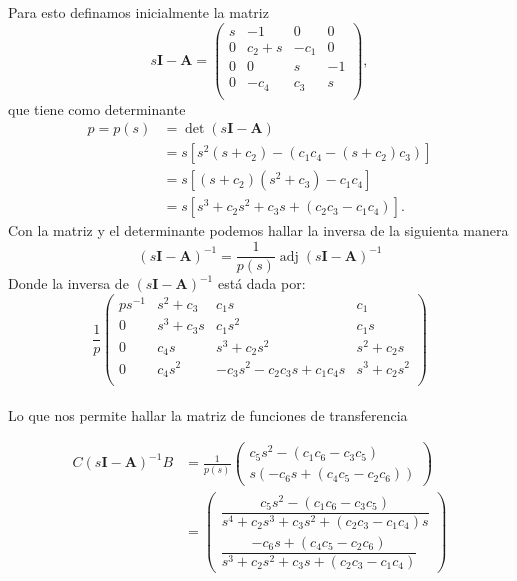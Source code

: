 Para esto definamos inicialmente la matriz
\[ s \bm{I} - \bm{A} =
  \begin{pmatrix}
     s & -1 & 0 & 0 \\
     0 & c_2+s & -c_1 & 0 \\
     0 & 0 & s & -1 \\
     0 & -c_4 & c_3 & s \\
  \end{pmatrix},
  \] que tiene como determinante
\begin{align*}
  p = p(s)
  &= \det(s \bm{I} - \bm{A})\\
  &= s [s^2 (s + c_2) - (c_1 c_4 - (s + c_2) c_3)]\\
  &= s [(s + c_2) (s^2 + c_3) - c_1 c_4]\\
  &= s [s^3 + c_2 s^2 + c_3 s + (c_2 c_3 - c_1 c_4)].
\end{align*}
Con la matriz y el determinante podemos hallar la inversa de la siguienta manera
\[ (s \bm{I} - \bm{A})^{-1} = \frac{1}{p(s)} \operatorname{adj} (s \bm{I} - \bm{A})^{-1} \]
Donde la inversa de $(s \bm{I} - \bm{A})^{-1}$ está dada por:
\[ \frac{1}{p}
  \begin{pmatrix}
    p s^{-1} & s^2+c_3 & c_1 s & c_1 \\
    0 & s^3+ c_3 s & c_{1} s^2 & c_{1} s \\
    0 & c_{4} s & s^3+c_{2} s^2 & s^2+c_{2} s \\
    0 & c_{4} s^2 & -c_{3} s^2-c_{2} c_{3} s+c_{1} c_{4} s & s^3+c_{2} s^2 \\
  \end{pmatrix}
\]
\\

Lo que nos permite hallar la matriz de funciones de transferencia

\begin{align*}
  C (s \bm{I} - \bm{A})^{-1} B
  &= \frac{1}{p(s)}
    \begin{pmatrix}
      c_5 s^2 - (c_1 c_6 - c_3 c_5)\\
      s (-c_6 s + (c_4 c_5 - c_2 c_6))
    \end{pmatrix}\\
  &=
    \begin{pmatrix}
      \dfrac{c_5 s^2 - (c_1 c_6 - c_3 c_5)}{s^4 + c_2 s^3 + c_3 s^2 + (c_2 c_3 - c_1 c_4)s}\\
      \dfrac{-c_6 s + (c_4 c_5 - c_2 c_6)}{s^3 + c_2 s^2 + c_3 s + (c_2 c_3 - c_1 c_4)}
    \end{pmatrix}
\end{align*}
\\

